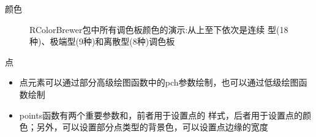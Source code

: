 \documentclass{beamerthemeMono}
\begin{document}
\begin{frame}[t]{\subsecname}{颜色}
\begin{overlayarea}{\textwidth}{\textheight}
{\begin{figure}
\begin{columns}
      \begin{column}{.4\textwidth}
        \centering
        \caption{RColorBrewer包中所有调色板颜色的演示:从上至下依次是连续
型(18种)、极端型(9种)和离散型(8种)调色板}
      \end{column}
    \end{columns}
\end{figure}}
\end{overlayarea}  
\end{frame}

\begin{frame}[t,fragile]{\subsecname}{点}
\begin{itemize}
\item 点元素可以通过部分高级绘图函数中的pch参数绘制，也可以通过低级绘图函数绘制
\item points函数有两个重要参数和，前者用于设置点的
样式，后者用于设置点的颜色；另外，可以设置部分点类型的背景色，可以设置点边缘的宽度
\end{itemize}

\begin{overlayarea}{\textwidth}{\textheight}
\end{overlayarea}
\end{frame}
\end{document}
